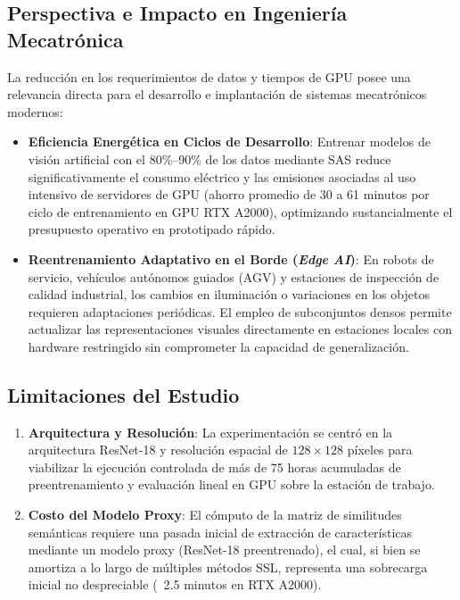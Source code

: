 \subsection{Perspectiva e Impacto en Ingeniería Mecatrónica}
La reducción en los requerimientos de datos y tiempos de GPU posee una relevancia directa para el desarrollo e implantación de sistemas mecatrónicos modernos:
\begin{itemize}
    \item \textbf{Eficiencia Energética en Ciclos de Desarrollo}: Entrenar modelos de visión artificial con el 80\%--90\% de los datos mediante SAS reduce significativamente el consumo eléctrico y las emisiones asociadas al uso intensivo de servidores de GPU (ahorro promedio de 30 a 61 minutos por ciclo de entrenamiento en GPU RTX A2000), optimizando sustancialmente el presupuesto operativo en prototipado rápido.
    \item \textbf{Reentrenamiento Adaptativo en el Borde (\textit{Edge AI})}: En robots de servicio, vehículos autónomos guiados (AGV) y estaciones de inspección de calidad industrial, los cambios en iluminación o variaciones en los objetos requieren adaptaciones periódicas. El empleo de subconjuntos densos permite actualizar las representaciones visuales directamente en estaciones locales con hardware restringido sin comprometer la capacidad de generalización.
\end{itemize}

\subsection{Limitaciones del Estudio}
\begin{enumerate}
    \item \textbf{Arquitectura y Resolución}: La experimentación se centró en la arquitectura ResNet-18 y resolución espacial de $128 \times 128$ píxeles para viabilizar la ejecución controlada de más de 75 horas acumuladas de preentrenamiento y evaluación lineal en GPU sobre la estación de trabajo.
    \item \textbf{Costo del Modelo Proxy}: El cómputo de la matriz de similitudes semánticas requiere una pasada inicial de extracción de características mediante un modelo proxy (ResNet-18 preentrenado), el cual, si bien se amortiza a lo largo de múltiples métodos SSL, representa una sobrecarga inicial no despreciable (~2.5 minutos en RTX A2000).
\end{enumerate}

